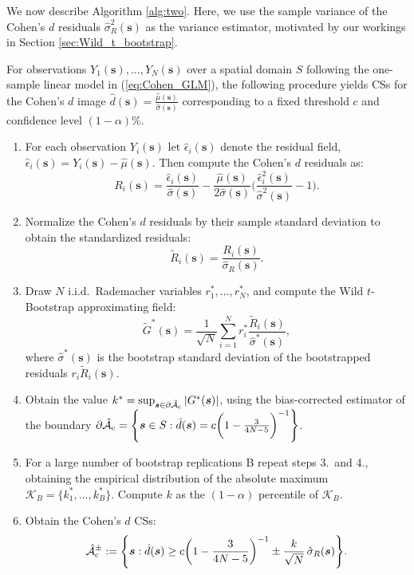 We now describe Algorithm \ref{alg:two}. Here, we use the sample variance of the Cohen's $d$ residuals $\hat{\sigma}_{R}^{2}(\bm{s})$ as the variance estimator, motivated by our workings in Section \ref{sec:Wild_t_bootstrap}.

\begin{algorithm}
\label{alg:two}
For observations $Y_{1}(\bm{s}), ..., Y_{N}(\bm{s})$ over a spatial domain $S$ following the one-sample linear model in (\ref{eq:Cohen_GLM}), the following procedure yields CSs for the Cohen's $d$ image $\hat{d}(\bm{s}) = \frac{\hat{\mu}(\bm{s})}{\hat{\sigma}(\bm{s})}$ corresponding to a fixed threshold $c$ and confidence level $(1 - \alpha)\%$.
\begin{enumerate}
\item For each observation $Y_i(\bm{s})$ let $\hat{\epsilon}_{i}(\bm{s})$ denote the residual field, $\hat{\epsilon}_{i}(\bm{s}) = Y_{i}(\bm{s}) - \hat{\mu}(\bm{s})$. Then compute the Cohen's $d$ residuals as: 
$$R_{i}(\bm{s}) = \frac{\hat{\epsilon}_{i}(\bm{s})}{\hat{\sigma}(\bm{s})} - \frac{\hat{\mu}(\bm{s})}{2\hat{\sigma}(\bm{s})}\Bigg( \frac{\hat{\epsilon}_{i}^{2}(\bm{s})}{\hat{\sigma}^{2}(\bm{s})} - 1 \Bigg).$$ 
\item Normalize the Cohen's $d$ residuals by their sample standard deviation to obtain the standardized residuals:
$$\tilde{R}_{i}(\bm{s}) = \frac{R_{i}(\bm{s})}{\hat{\sigma}_{R}(\bm{s})}.$$ 
\item Draw $N$ i.i.d.\ Rademacher variables $r_{1}^{*}, ..., r_{N}^{*}$, and compute the Wild $t$-Bootstrap approximating field:
$$\tilde{G}^{*}(\bm{s}) = \frac{1}{\sqrt{N}}\sum_{i=1}^{N} r^*_i\frac{\tilde{R}_{i}(\bm{s})}{\hat{\sigma}^*(\bm{s})},$$
where $\hat{\sigma}^{*}(\bm{s})$ is the bootstrap standard deviation of the bootstrapped residuals $r_{i}\tilde{R}_{i}(\bm{s})$. 
\item Obtain the value $k^{*} = \sup_{\bm{s}\in\operatorname{\partial\hat{\mathcal{A}}_{c}}}|G^{*}(\bm{s})|$, using the bias-corrected estimator of the boundary $\operatorname{\partial\hat{\mathcal{A}}_{c}} = \Bigg\{\bm{s} \in S : \hat{d}(\bm{s}) = c\bigg(1 - \frac{3}{4N - 5}\bigg)^{-1} \Bigg\}$.
\item For a large number of bootstrap replications B repeat steps 3.\ and 4., obtaining the empirical distribution of the absolute maximum $\mathcal{K}_{B} = \{k_{1}^{*}, ..., k_{B}^{*}\}$. Compute $k$ as the $(1 - \alpha)$ percentile of $\mathcal{K}_{B}$.
\item Obtain the Cohen's $d$ CSs:
$$\operatorname{\hat{\mathcal{A}}_{c}^\pm} := \Bigg\{\bm{s} : \hat{d}(\bm{s}) \geq c\bigg(1 - \frac{3}{4N - 5}\bigg)^{-1} \pm \frac{k}{\sqrt{N}}\, \hat{\sigma}_{R}(\bm{s}) \Bigg\}.$$
\end{enumerate}
\end{algorithm}

